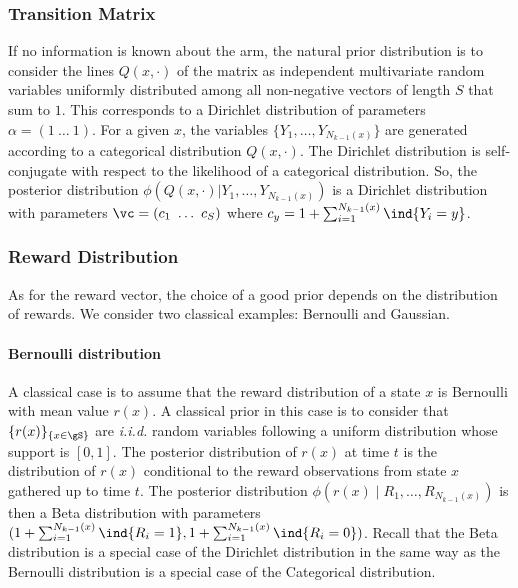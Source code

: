 \subsubsection{Transition Matrix}
If no information is known about the arm, the natural prior distribution is to consider the lines $Q(x,\cdot)$ of the matrix as independent multivariate random variables uniformly distributed among all non-negative vectors of length $S$ that sum to $1$. 
This corresponds to a Dirichlet distribution of parameters $\alpha=(1\ \dots\ 1)$. 
For a given $x$, the variables $\{Y_1,\dots,Y_{N_{k-1}(x)}\}$ are generated according to a categorical distribution $Q(x,\cdot)$. 
The Dirichlet distribution is self-conjugate with respect to the likelihood of a categorical distribution. 
So, the posterior distribution $\phi(Q(x,\cdot)| Y_1,\dots,Y_{N_{k-1}(x)})$ is a Dirichlet distribution with parameters $\vc=(c_1\ \dots\ c_S)$ where $c_y=1+\sum_{i=1}^{N_{k-1}(x)}\ind{Y_i=y}$.

\subsubsection{Reward Distribution}
\label{apx:reward_post}

As for the reward vector, the choice of a good prior depends on the distribution of rewards. 
We consider two classical examples: Bernoulli and Gaussian.

\paragraph{Bernoulli distribution}
A classical case is to assume that the reward distribution of a state $x$ is Bernoulli with mean value $r(x)$.
A classical prior in this case is to consider that $\{r(x)\}_{\{x\in\gS\}}$ are \emph{i.i.d.} random variables following a uniform distribution whose support is $[0,1]$. 
The posterior distribution of $r(x)$ at time $t$ is the distribution of $r(x)$ conditional to the reward observations from state $x$ gathered up to time $t$. 
The posterior distribution $\phi(r(x)\mid R_1,\dots,R_{N_{k-1}(x)})$ is then a Beta distribution with parameters $(1+\sum_{i=1}^{N_{k-1}(x)}\ind{R_i=1}, 1+\sum_{i=1}^{N_{k-1}(x)}\ind{R_i=0})$. 
Recall that the Beta distribution is a special case of the Dirichlet distribution in the same way as the Bernoulli distribution is a special case of the Categorical distribution. 

